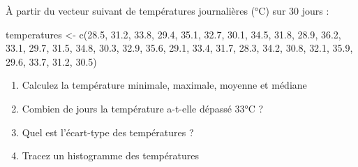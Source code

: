 \documentclass[
  french,
  11pt,
  a4paper,
]{article}
\newenvironment{Shaded}{}{}
\newcommand{\FloatTok}[1]{\textcolor[rgb]{0.00,0.36,0.77}{#1}}
\newcommand{\FunctionTok}[1]{\textcolor[rgb]{0.44,0.26,0.76}{#1}}
\newcommand{\NormalTok}[1]{\textcolor[rgb]{0.14,0.16,0.18}{#1}}
\newcommand{\OtherTok}[1]{\textcolor[rgb]{0.44,0.26,0.76}{#1}}
\providecommand{\tightlist}{%
  \setlength{\itemsep}{0pt}\setlength{\parskip}{0pt}}
\begin{document}
\begin{tcolorbox}[enhanced jigsaw, arc=.35mm, bottomrule=.15mm, bottomtitle=1mm, breakable, colback=white, colbacktitle=quarto-callout-caution-color!10!white, colframe=quarto-callout-caution-color-frame, coltitle=black, left=2mm, leftrule=.75mm, opacityback=0, opacitybacktitle=0.6, rightrule=.15mm, title=\textcolor{quarto-callout-caution-color}{\faFire}\hspace{0.5em}{Exercice 11}, titlerule=0mm, toprule=.15mm, toptitle=1mm]

À partir du vecteur suivant de températures journalières (°C) sur 30
jours :

\begin{Shaded}
\begin{Highlighting}[]
\NormalTok{temperatures }\OtherTok{\textless{}{-}} \FunctionTok{c}\NormalTok{(}\FloatTok{28.5}\NormalTok{, }\FloatTok{31.2}\NormalTok{, }\FloatTok{33.8}\NormalTok{, }\FloatTok{29.4}\NormalTok{, }\FloatTok{35.1}\NormalTok{, }\FloatTok{32.7}\NormalTok{, }\FloatTok{30.1}\NormalTok{, }
                  \FloatTok{34.5}\NormalTok{, }\FloatTok{31.8}\NormalTok{, }\FloatTok{28.9}\NormalTok{, }\FloatTok{36.2}\NormalTok{, }\FloatTok{33.1}\NormalTok{, }\FloatTok{29.7}\NormalTok{, }\FloatTok{31.5}\NormalTok{, }\FloatTok{34.8}\NormalTok{,}
                  \FloatTok{30.3}\NormalTok{, }\FloatTok{32.9}\NormalTok{, }\FloatTok{35.6}\NormalTok{, }\FloatTok{29.1}\NormalTok{, }\FloatTok{33.4}\NormalTok{, }\FloatTok{31.7}\NormalTok{, }\FloatTok{28.3}\NormalTok{, }\FloatTok{34.2}\NormalTok{,}
                  \FloatTok{30.8}\NormalTok{, }\FloatTok{32.1}\NormalTok{, }\FloatTok{35.9}\NormalTok{, }\FloatTok{29.6}\NormalTok{, }\FloatTok{33.7}\NormalTok{, }\FloatTok{31.2}\NormalTok{, }\FloatTok{30.5}\NormalTok{)}
\end{Highlighting}
\end{Shaded}

\begin{enumerate}
\def\labelenumi{\arabic{enumi}.}
\tightlist
\item
  Calculez la température minimale, maximale, moyenne et médiane
\item
  Combien de jours la température a-t-elle dépassé 33°C ?
\item
  Quel est l'écart-type des températures ?
\item
  Tracez un histogramme des températures
\end{enumerate}

\end{tcolorbox}
\end{document}
